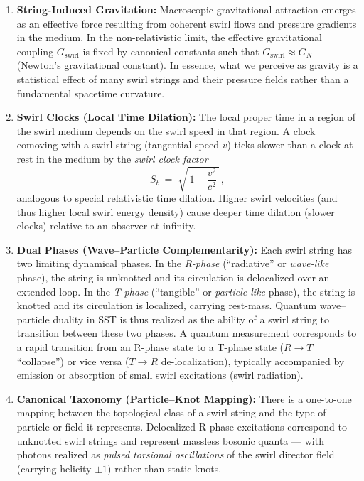 \documentclass[10pt,reprint,aps,onecolumn,nofootinbib]{revtex4-2}
\begin{document}
\begin{enumerate}
	\textit{Rosetta remark.} In the linear mapping to conventional superfluid notation, the circulation quantum
	$\Gamma_0$ matches the Onsager–Feynman value $h/m_{\text{eff}}$ for the relevant excitation, but within SST
	we treat $\Gamma_0$ as primitive and regard $h$ as a derived quantity.
	\item \textbf{String-Induced Gravitation:} Macroscopic gravitational attraction emerges as an effective force resulting from coherent swirl flows and pressure gradients in the medium. In the non-relativistic limit, the effective gravitational coupling $G_{\text{swirl}}$ is fixed by canonical constants such that $G_{\text{swirl}} \approx G_N$ (Newton’s gravitational constant). In essence, what we perceive as gravity is a statistical effect of many swirl strings and their pressure fields rather than a fundamental spacetime curvature.
	\item \textbf{Swirl Clocks (Local Time Dilation):} The local proper time in a region of the swirl medium depends on the swirl speed in that region. A clock comoving with a swirl string (tangential speed $v$) ticks slower than a clock at rest in the medium by the \emph{swirl clock factor}
	\[
		S_t \;=\; \sqrt{\,1 - \frac{v^2}{c^2}\,}\,,
	\]
	analogous to special relativistic time dilation. Higher swirl velocities (and thus higher local swirl energy density) cause deeper time dilation (slower clocks) relative to an observer at infinity.
	\item \textbf{Dual Phases (Wave–Particle Complementarity):} Each swirl string has two limiting dynamical phases. In the \emph{R-phase} (“radiative” or \emph{wave-like} phase), the string is unknotted and its circulation is delocalized over an extended loop. In the \emph{T-phase} (“tangible” or \emph{particle-like} phase), the string is knotted and its circulation is localized, carrying rest-mass. Quantum wave–particle duality in SST is thus realized as the ability of a swirl string to transition between these two phases. A quantum measurement corresponds to a rapid transition from an R-phase state to a T-phase state ($R\to T$ “collapse”) or vice versa ($T\to R$ de-localization), typically accompanied by emission or absorption of small swirl excitations (swirl radiation).
    \item \textbf{Canonical Taxonomy (Particle–Knot Mapping):}
    There is a one-to-one mapping between the topological class of a swirl string and the type of particle or field it represents.
    Delocalized R-phase excitations correspond to unknotted swirl strings and represent massless bosonic quanta — with photons realized as \emph{pulsed torsional oscillations} of the swirl director field (carrying helicity $\pm 1$) rather than static knots.

\end{enumerate}
\end{document}
